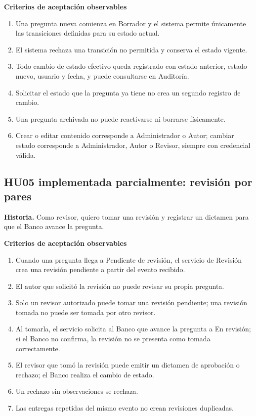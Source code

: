 \documentclass[12pt,a4paper]{article}
\begin{document}
\textbf{Criterios de aceptación observables}
\begin{enumerate}[leftmargin=*]
\item Una pregunta nueva comienza en Borrador y el sistema permite únicamente las transiciones definidas para su estado actual.
\item El sistema rechaza una transición no permitida y conserva el estado vigente.
\item Todo cambio de estado efectivo queda registrado con estado anterior, estado nuevo, usuario y fecha, y puede consultarse en Auditoría.
\item Solicitar el estado que la pregunta ya tiene no crea un segundo registro de cambio.
\item Una pregunta archivada no puede reactivarse ni borrarse físicamente.
\item Crear o editar contenido corresponde a Administrador o Autor; cambiar estado corresponde a Administrador, Autor o Revisor, siempre con credencial válida.
\end{enumerate}

\subsection{HU05 implementada parcialmente: revisión por pares}
\textbf{Historia.} Como revisor, quiero tomar una revisión y registrar un dictamen para que el Banco avance la pregunta.

\textbf{Criterios de aceptación observables}
\begin{enumerate}[leftmargin=*]
\item Cuando una pregunta llega a Pendiente de revisión, el servicio de Revisión crea una revisión pendiente a partir del evento recibido.
\item El autor que solicitó la revisión no puede revisar su propia pregunta.
\item Solo un revisor autorizado puede tomar una revisión pendiente; una revisión tomada no puede ser tomada por otro revisor.
\item Al tomarla, el servicio solicita al Banco que avance la pregunta a En revisión; si el Banco no confirma, la revisión no se presenta como tomada correctamente.
\item El revisor que tomó la revisión puede emitir un dictamen de aprobación o rechazo; el Banco realiza el cambio de estado.
\item Un rechazo sin observaciones se rechaza.
\item Las entregas repetidas del mismo evento no crean revisiones duplicadas.
\end{enumerate}
\end{document}
